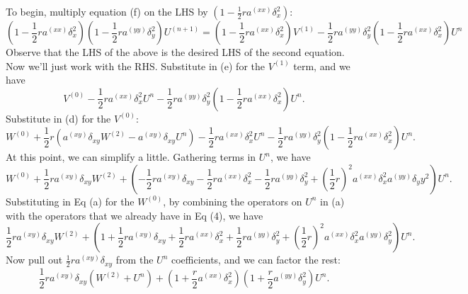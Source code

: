 \documentclass[11pt]{article}
\def\f{\frac }
\begin{document}
\begin{enumerate}
To begin, multiply equation (f) on the LHS by $\left ( 1 - \f{1}{2} r a ^{(xx)} \delta _x ^2 \right )$:
\begin{equation} \left ( 1 - \f{1}{2} r a ^{(xx)} \delta _x ^2 \right ) \left ( 1 - \f{1}{2} r a ^{(yy)} \delta _y ^2 \right ) U^{(n+1)} = \left ( 1 - \f{1}{2} r a ^{(xx)} \delta _x ^2 \right ) V^{(1)} - \f{1}{2} r a ^{(yy)} \delta _y ^ 2 \left ( 1 - \f{1}{2} r a ^{(xx)} \delta _x ^2 \right ) U^n \end{equation}
Observe that the LHS of the above is the desired LHS of the second equation.
Now we'll just work with the RHS.
Substitute in (e) for the $V^{(1)}$ term, and we have
\begin{equation} V^{(0)} - \f{1}{2} r a ^{(xx)} \delta _x ^ 2 U^n - \f{1}{2} r a ^{(yy)} \delta _y ^ 2 \left ( 1 - \f{1}{2} r a ^{(xx)} \delta _x ^2 \right ) U^n .\end{equation}
Substitute in (d) for the $V^{(0)}$:
\begin{equation} W^{(0)} + \f{1}{2} r \left ( a^{(xy)} \delta _{xy} W^{(2)}  - a^{(xy)} \delta _{xy} U^n \right ) - \f{1}{2} r a ^{(xx)} \delta _x ^ 2 U^n - \f{1}{2} r a ^{(yy)} \delta _y ^ 2 \left ( 1 - \f{1}{2} r a ^{(xx)} \delta _x ^2 \right ) U^n .\end{equation}
At this point, we can simplify a little.
Gathering terms in $U^n$, we have
\begin{equation} W^{(0)} + \f{1}{2} r a^{(xy)} \delta _{xy} W^{(2)}  + \left ( - \f{1}{2} r  a^{(xy)} \delta _{xy} - \f{1}{2} r a ^{(xx)} \delta _x ^ 2 - \f{1}{2} r a ^{(yy)} \delta _y ^ 2 +  \left ( \f{1}{2} r \right ) ^ 2 a ^{(xx)} \delta _x ^2 a ^{(yy)} \delta _yy ^2 \right ) U^n .\end{equation}
Substituting in Eq (a) for the $W^{(0)}$, by combining the operators on $U^n$ in (a) with the operators that we already have in Eq (4), we have
\begin{equation} \f{1}{2} r a^{(xy)} \delta _{xy} W^{(2)}  + \left ( 1 + \f{1}{2} r  a^{(xy)} \delta _{xy} + \f{1}{2} r a ^{(xx)} \delta _x ^ 2 + \f{1}{2} r a ^{(yy)} \delta _y ^ 2 +  \left ( \f{1}{2} r \right ) ^ 2 a ^{(xx)} \delta _x ^2 a ^{(yy)} \delta _y ^2 \right ) U^n .\end{equation}
Now pull out $\f{1}{2} r a^{(xy)} \delta _{xy}$ from the $U^n$ coefficients, and we can factor the rest:
\begin{equation} \f{1}{2} r a^{(xy)} \delta _{xy} \left ( W^{(2)} + U^n \right ) + \left ( 1 + \f{r}{2} a ^{(xx)} \delta _x ^ 2 \right ) \left (1 +  \f{r}{2}  a ^{(yy)} \delta _y ^ 2 \right ) U^n .\end{equation}

\end{enumerate}
\end{document}
